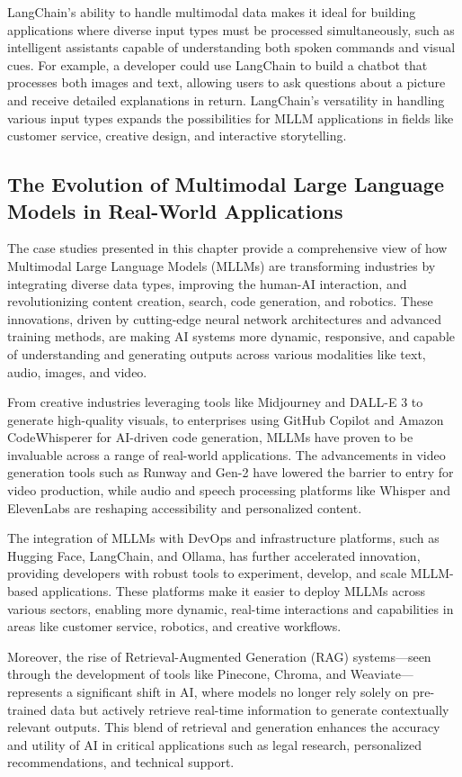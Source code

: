 LangChain’s ability to handle multimodal data makes it ideal for building applications where diverse input types must be processed simultaneously, such as intelligent assistants capable of understanding both spoken commands and visual cues. 
For example, a developer could use LangChain to build a chatbot that processes both images and text, allowing users to ask questions about a picture and receive detailed explanations in return. 
LangChain’s versatility in handling various input types expands the possibilities for MLLM applications in fields like customer service, creative design, and interactive storytelling.


\subsection{The Evolution of Multimodal Large Language Models in Real-World Applications}
The case studies presented in this chapter provide a comprehensive view of how Multimodal Large Language Models (MLLMs) are transforming industries by integrating diverse data types, improving the human-AI interaction, and revolutionizing content creation, search, code generation, and robotics. These innovations, driven by cutting-edge neural network architectures and advanced training methods, are making AI systems more dynamic, responsive, and capable of understanding and generating outputs across various modalities like text, audio, images, and video.

From creative industries leveraging tools like Midjourney and DALL-E 3 to generate high-quality visuals, to enterprises using GitHub Copilot and Amazon CodeWhisperer for AI-driven code generation, MLLMs have proven to be invaluable across a range of real-world applications. The advancements in video generation tools such as Runway and Gen-2 have lowered the barrier to entry for video production, while audio and speech processing platforms like Whisper and ElevenLabs are reshaping accessibility and personalized content.

The integration of MLLMs with DevOps and infrastructure platforms, such as Hugging Face, LangChain, and Ollama, has further accelerated innovation, providing developers with robust tools to experiment, develop, and scale MLLM-based applications. These platforms make it easier to deploy MLLMs across various sectors, enabling more dynamic, real-time interactions and capabilities in areas like customer service, robotics, and creative workflows.

Moreover, the rise of Retrieval-Augmented Generation (RAG) systems—seen through the development of tools like Pinecone, Chroma, and Weaviate—represents a significant shift in AI, where models no longer rely solely on pre-trained data but actively retrieve real-time information to generate contextually relevant outputs. This blend of retrieval and generation enhances the accuracy and utility of AI in critical applications such as legal research, personalized recommendations, and technical support.

